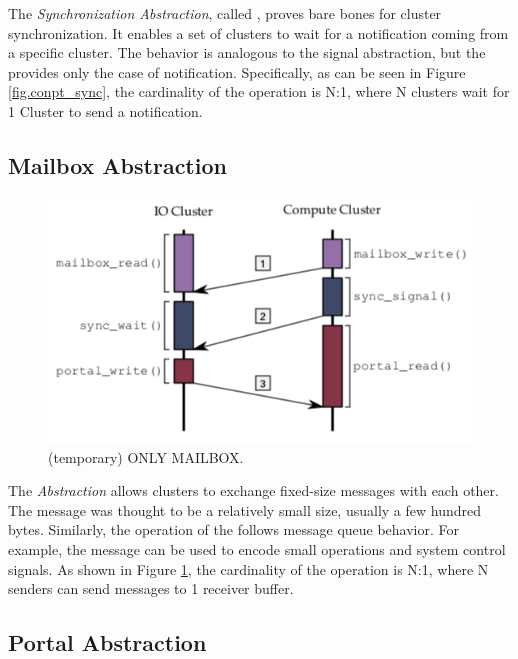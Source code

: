 			The \textit{Synchronization Abstraction}, called \sync, proves bare bones
			for cluster synchronization.
			It enables a set of clusters to wait for a notification coming from a
			specific cluster.
			The behavior is analogous to the \posix signal abstraction, but the \sync
			provides only the case of notification.
			Specifically, as can be seen in Figure \ref{fig.conpt_sync}, the
			cardinality of the operation is N:1, where N clusters wait for 1 Cluster
			to send a notification.

		\subsection{Mailbox Abstraction}
		\label{sec.mailbox_abs}

			\begin{figure}[h]
				\centering
				\includegraphics[width=.7\textwidth]{images/conceptual-sync.png}

				\caption{
					(temporary) ONLY MAILBOX.
				}\par
				\label{fig.conpt_mailbox}
			\end{figure}

			The \textit{\mailbox Abstraction} allows clusters to exchange fixed-size
			messages with each other.
			The message was thought to be a relatively small size, usually a few hundred bytes.
			Similarly, the operation of the \mailbox follows \posix message queue behavior.
			For example, the message can be used to encode small operations and system
			control signals.
			As shown in Figure \ref{fig.conpt_mailbox}, the cardinality of the operation
			is N:1, where N senders can send messages to 1 receiver buffer.

		\subsection{Portal Abstraction}
		\label{sec.portal_abs}

